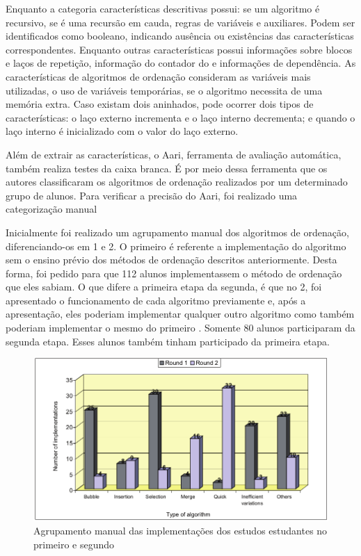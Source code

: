 	    Enquanto a categoria características descritivas possui: se um algoritmo é
	    recursivo, se é uma recursão em cauda, regras de variáveis e 
	    auxiliares. Podem ser identificados como booleano, indicando ausência ou
	    existências das características correspondentes. Enquanto outras características
	    possui informações sobre blocos e laços de repetição, informação do contador do
	     e informações de dependência. As características de algoritmos de
	    ordenação consideram as variáveis mais utilizadas, o uso de variáveis temporárias,
	    se o algoritmo necessita de uma memória extra. Caso existam dois  aninhados,
	    pode ocorrer dois tipos de características: o laço externo incrementa e o laço
	    interno decrementa; e quando o laço interno é inicializado com o valor do laço
	    externo. 
	    
	    Além de extrair as características, o Aari, ferramenta de avaliação automática,
	    também realiza testes da caixa branca. É por meio dessa ferramenta que os
	    autores classificaram os algoritmos de ordenação realizados por um determinado
	    grupo de alunos. Para verificar a precisão do Aari, foi realizado uma
	    categorização manual
	    
	    Inicialmente foi realizado um agrupamento manual dos algoritmos de ordenação,
	    diferenciando-os em  1 e  2. O primeiro
	     é referente a implementação do algoritmo sem o ensino
	    prévio dos métodos de ordenação descritos anteriormente. Desta forma,
	    foi pedido para que 112 alunos implementassem o método de ordenação que
	    eles sabiam. O que difere a primeira etapa da segunda, é que no 
	    2, foi apresentado o funcionamento de cada algoritmo previamente e, após a
	    apresentação, eles poderiam implementar qualquer outro algoritmo como também
	    poderiam implementar o mesmo do primeiro . Somente 80 alunos
	    participaram da segunda etapa. Esses alunos também tinham participado da
	    primeira etapa.
	    
	    \begin{figure}[h]
	        \centering
	        \includegraphics[scale=0.4]{imagem/clusterManual.png}
	        \caption{Agrupamento manual das implementações dos estudos estudantes no
	        	primeiro e segundo }
	        \label{fig:clusterManual}
	    \end{figure}
	    
